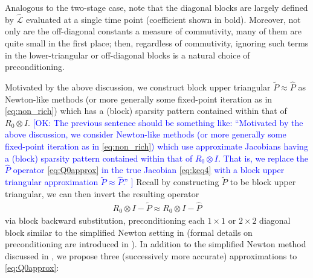 \documentclass[review]{siamart}
\newcommand{\OK}[1]{\textcolor{blue}{[OK: #1]}}
\begin{document}
%
Analogous to the two-stage case, note that the diagonal blocks are largely
defined by $\widehat{\mathcal{L}}$ evaluated at a single time point (coefficient
shown in bold). Moreover, not only are the off-diagonal constants
a measure of commutivity, many of them are quite small in the first place;
then, regardless of commutivity, ignoring such terms in the lower-triangular
or off-diagonal blocks is a natural choice of preconditioning.

Motivated by the above discussion, we construct {block upper triangular}
$\widetilde{P} \approx \widehat{P}$ as Newton-like methods (or more
generally some fixed-point iteration as in \eqref{eq:non_rich}) which has
a (block) sparsity pattern contained within that of $R_0 \otimes I$. 
%
\OK{
The previous sentence should be something like: ``Motivated by the above discussion, we consider Newton-like methods (or more
generally some fixed-point iteration as in \eqref{eq:non_rich}) which use approximate Jacobians having
a (block) sparsity pattern contained within that of $R_0 \otimes I$. That is, we replace the $\widehat{P}$ operator \eqref{eq:Q0approx} in the true Jacobian \eqref{eq:keq4} with a block upper triangular approximation $\widetilde{P} \approx \widehat{P}$.''
}
%
Recall
by constructing $\widetilde{P}$ to be block upper triangular, we can then
invert the resulting operator
%
\begin{align}
R_0 \otimes I -  \widetilde{P} \approx R_0 \otimes I -\widehat{P}
\end{align}
%
via block backward substitution, preconditioning each $1\times 1$
or $2\times 2$ diagonal block similar to the simplified Newton setting in
 (formal details on preconditioning are introduced
in ). In addition to the simplified Newton
method discussed in , we propose three (successively
more accurate) approximations to \eqref{eq:Q0approx}:
\vspace{1ex}
%
\end{document}

